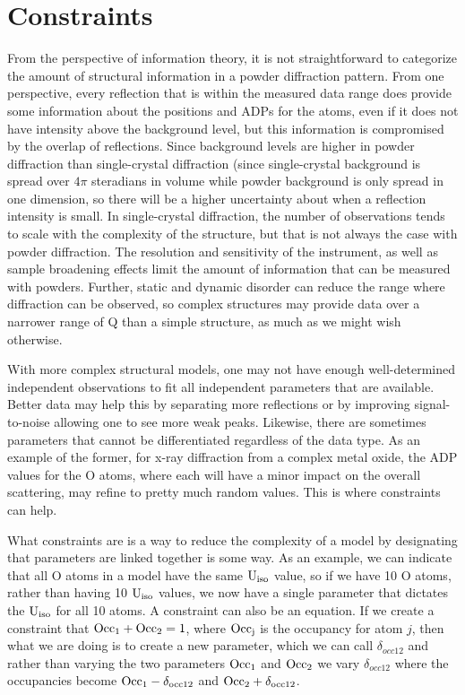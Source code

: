 \chapter{Constraints}\label{Chap:constraints}

From the perspective of information theory, it is not straightforward to categorize the amount of structural information in a powder diffraction pattern. From one perspective, every reflection that is within the measured data range does provide some information about the positions and ADPs for the atoms, even if it does not have intensity above the background level, but this information is compromised by the overlap of reflections. Since background levels are higher in powder diffraction than single-crystal diffraction (since single-crystal background is spread over $4\pi$ steradians in volume while powder background is only spread in one dimension, so there will be a higher uncertainty about when a reflection intensity is small. In single-crystal diffraction, the number of observations tends to scale with the complexity of the structure, but that is not always the case with powder diffraction. The resolution and sensitivity of the instrument, as well as sample broadening effects limit the amount of information that can be measured with powders. Further, static and dynamic disorder can reduce the range where diffraction can be observed, so complex structures may provide data over a narrower range of Q than a simple structure, as much as we might wish otherwise. 

With more complex structural models, one may not have enough well-determined independent observations to fit all independent parameters that are available. Better data may help this by separating more reflections or by improving signal-to-noise allowing one to see more weak peaks. Likewise, there are sometimes parameters that cannot be differentiated regardless of the data type. As an example of the former, for x-ray diffraction from a complex metal oxide, the ADP values for the O atoms, where each will have a minor impact on the overall scattering, may refine to pretty much random values. This is where constraints can help. 

What constraints are is a way to reduce the complexity of a model by designating that parameters are linked together is some way. As an example, we can indicate that all O atoms in a model have the same $\rm U_{iso}$ value, so if we have 10 O atoms, rather than having 10 $\rm U_{iso}$ values, we now have a single parameter that dictates the $\rm U_{iso}$ for all 10 atoms. A constraint can also be an equation. If we create a constraint that $\rm Occ_1 + Occ_2 = 1$, where $\rm Occ_j$ is the occupancy for atom $j$, then what we are doing is to create a new parameter, which we can call $\delta_{occ12}$ and rather than varying the two parameters $\rm Occ_1$ and $\rm Occ_2$ we vary $\delta_{occ12}$ where the occupancies become $\rm Occ_1-\delta_{occ12}$ and $\rm Occ_2+\delta_{occ12}$. 

